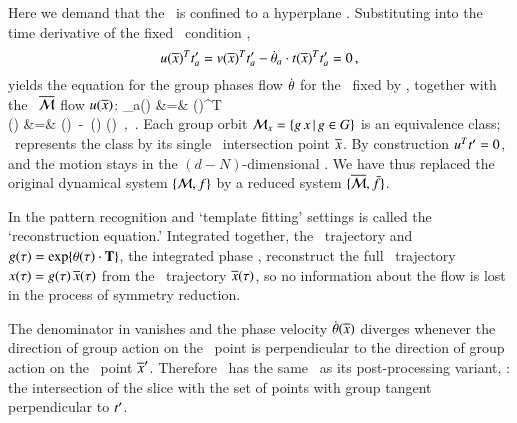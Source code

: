 Here we demand that the \reducedsp\ is confined to a
hyperplane \slice.
Substituting  into the time derivative of
the fixed \slice\ condition ,
\[
u(\overline{x})^T t'_{a} =
v(\overline{x})^T t'_{a} -
\dot{{\bf \theta}}_a \cdot
t(\overline{x})^T  t'_{a}
= 0
    \,,
\]
yields the equation for the group phases flow
$\dot{{\bf \theta}}$
for the \slice\ fixed by \slicep, together with the
\reducedsp\ $\overline{\cal M}$  flow $u(\overline{x})$:
\bea
\dot{\gSpace}_a(\sspRed) &=& 
                       {\groupTan(\sspRed)^T \cdot \sliceTan{} }
\label{MFdtheta}\\
\velRed(\sspRed) &=& \vel(\sspRed)
                    \,-\, \dot{\gSpace}(\sspRed)  \cdot \groupTan(\sspRed)
    \,,\qquad\quad \sspRed \in \pSRed
\,.
\label{EqMotMFrame}
\eea
Each group orbit
${\cal M}_{x} = \{  g \, x \,|\, g \in G \}$
is an equivalence class; \mslices\ represents the class by
its single \slice\ intersection point $\overline{x}$. By
construction $u^T t'_{} = 0$, and  the motion
stays in the $(d\!-\!N)$-dim\-ens\-ion\-al \slice. We have
thus replaced the original dynamical system $\{{\cal M},f\}$ by a reduced
system $\{\overline{\cal M},\bar{f}\}$.

In the pattern recognition and `template fitting' settings
 is called the `reconstruction equation.'
Integrated together, the \reducedsp\ trajectory
 and
$g(\tau)=\exp\{{\bf \theta}(\tau) \cdot \mathbf{T} \}$,
the integrated phase
, reconstruct the full \statesp\ trajectory
$x(\tau)= g(\tau)\,\overline{x}(\tau)$ from the
\reducedsp\  trajectory $\overline{x}(\tau)$, so no information
about the flow is lost in the process of symmetry reduction.

The denominator in
 vanishes and the phase velocity
$\dot{{\bf \theta}}(\overline{x})$ diverges whenever the direction of
group action on the \reducedsp\ point is perpendicular to the
direction of group action on the \slice\ point ${\overline{x}'}$.
Therefore \mslices\ has the same \sset\ as its
post-processing variant, \mframes: the intersection of the slice
with the set of points with group tangent perpendicular to $t'_{}$.

